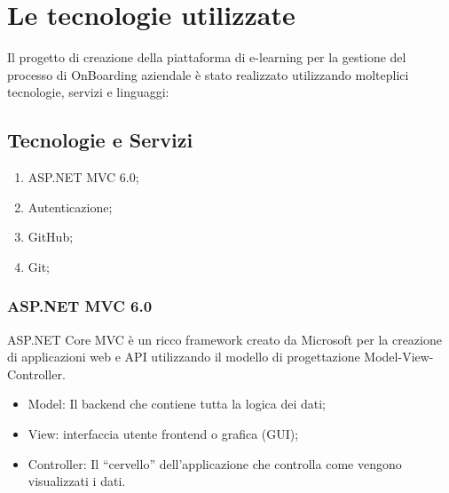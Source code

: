 \chapter{Le tecnologie utilizzate}\label{chapter:formattazione}
%
Il progetto di creazione della piattaforma di e-learning per la gestione del processo di 
OnBoarding aziendale è stato realizzato utilizzando molteplici tecnologie, servizi e linguaggi:
%
\section{Tecnologie e Servizi}\label{sec:cap_sec_subsec}
\begin{enumerate}
    \item ASP.NET MVC 6.0;
    \item Autenticazione;
    \item GitHub;
    \item Git;
\end{enumerate}
\subsection{ASP.NET MVC 6.0}\label{sec:cap_sec_subsec}
ASP.NET Core MVC è un ricco framework creato da Microsoft per la creazione di applicazioni web e API 
utilizzando il modello di progettazione Model-View-Controller.
\begin{itemize}
    \item Model: Il backend che contiene tutta la logica dei dati;
    \item View: interfaccia utente frontend o grafica (GUI);
    \item Controller: Il ``cervello'' dell'applicazione che controlla come vengono visualizzati i dati.
\end{itemize}
